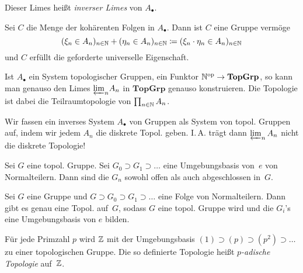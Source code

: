 \documentclass{cheat-sheet}
\newcommand{\TopGrp}{\mathbf{TopGrp}} %
\newcommand{\op}{\mathrm{op}} %
\begin{document}
\begin{defn}
  Dieser Limes heißt \emph{inverser Limes} von $A_\bullet$.
\end{defn}

\begin{konstr}
  Sei $C$ die Menge der kohärenten Folgen in $A_\bullet$.
  Dann ist $C$ eine Gruppe vermöge
  \[
    (\xi_n \in A_n)_{n \in \mathbb{N}} + (\eta_n \in A_n)_{n \in \mathbb{N}} \coloneqq (\xi_n \cdot \eta_n \in A_n)_{n \in \mathbb{N}}
  \]
  und $C$ erfüllt die geforderte universelle Eigenschaft.
\end{konstr}

\begin{bem}
  Ist $A_\bullet$ ein System topologischer Gruppen, \dh{} ein Funktor $\N^\op \to \TopGrp$, so kann man genauso den Limes ${\varprojlim}_{n} A_n$ in $\TopGrp$ genauso konstruieren.
  Die Topologie ist dabei die Teilraumtopologie von $\prod_{n \in \N} A_n$.
\end{bem}

\begin{acht}
  Wir fassen ein inverses System $A_\bullet$ von Gruppen als System von topol. Gruppen auf, indem wir jedem $A_n$ die diskrete Topol. geben.
  I.\,A. trägt dann $\varprojlim_{n} A_n$ nicht die diskrete Topologie!
\end{acht}


\begin{prop}
  Sei $G$ eine topol. Gruppe.
  Sei $G_0 \supset G_1 \supset \ldots$ eine Umgebungsbasis von~$e$ von Normalteilern.
  Dann sind die $G_n$ sowohl offen als auch abgeschlossen in~$G$.
\end{prop}

\begin{bem}
  Sei $G$ eine Gruppe und $G \supset G_0 \supset G_1 \supset \ldots$ eine Folge von Normalteilern.
  Dann gibt es genau eine Topol. auf~$G$, sodass $G$ eine topol. Gruppe wird und die $G_i$'s eine Umgebungsbasis von $e$ bilden.
\end{bem}

\begin{bsp}
  Für jede Primzahl $p$ wird $\mathbb{Z}$ mit der Umgebungsbasis $(1) \supset (p) \supset (p^2) \supset \ldots$ zu einer topologischen Gruppe.
  Die so definierte Topologie heißt \emph{$p$-adische Topologie} auf~$\mathbb{Z}$.
\end{bsp}
\end{document}
